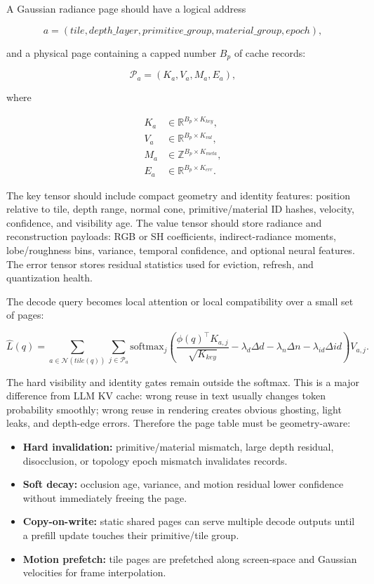 \documentclass[11pt]{article}
\begin{document}
A Gaussian radiance page should have a logical address

\[
  a = (tile, depth\_layer, primitive\_group, material\_group, epoch),
\]

and a physical page containing a capped number $B_p$ of cache records:

\[
  \mathcal{P}_a =
  (K_a,V_a,M_a,E_a),
\]

where

\[
\begin{aligned}
  K_a &\in \mathbb{R}^{B_p\times K_{key}},\\
  V_a &\in \mathbb{R}^{B_p\times K_{val}},\\
  M_a &\in \mathbb{Z}^{B_p\times K_{meta}},\\
  E_a &\in \mathbb{R}^{B_p\times K_{err}}.
\end{aligned}
\]

The key tensor should include compact geometry and identity features:
position relative to tile, depth range, normal cone, primitive/material ID
hashes, velocity, confidence, and visibility age. The value tensor should store
radiance and reconstruction payloads: RGB or SH coefficients, indirect-radiance
moments, lobe/roughness bins, variance, temporal confidence, and optional
neural features. The error tensor stores residual statistics used for eviction,
refresh, and quantization health.

The decode query becomes local attention or local compatibility over a small
set of pages:

\[
  \hat L(q)=
  \sum_{a\in\mathcal{N}(tile(q))}\sum_{j\in\mathcal{P}_a}
  \mathrm{softmax}_j\left(\frac{\phi(q)^\top K_{a,j}}{\sqrt{K_{key}}}
  -\lambda_d\Delta d-\lambda_n\Delta n-\lambda_{id}\Delta id\right)V_{a,j}.
\]

The hard visibility and identity gates remain outside the softmax. This is a
major difference from LLM KV cache: wrong reuse in text usually changes token
probability smoothly; wrong reuse in rendering creates obvious ghosting,
light leaks, and depth-edge errors. Therefore the page table must be
geometry-aware:

\begin{itemize}
  \item \textbf{Hard invalidation:} primitive/material mismatch, large depth
        residual, disocclusion, or topology epoch mismatch invalidates records.
  \item \textbf{Soft decay:} occlusion age, variance, and motion residual lower
        confidence without immediately freeing the page.
  \item \textbf{Copy-on-write:} static shared pages can serve multiple decode
        outputs until a prefill update touches their primitive/tile group.
  \item \textbf{Motion prefetch:} tile pages are prefetched along screen-space
        and Gaussian velocities for frame interpolation.
\end{itemize}
\end{document}
